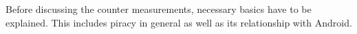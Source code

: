 Before discussing the counter measurements, necessary basics have to be explained. This includes piracy in general as well as its relationship with Android.

